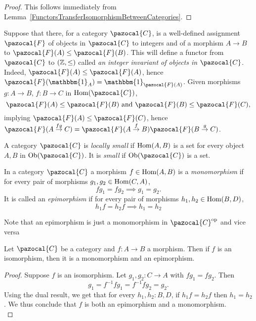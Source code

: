 \begin{proof}
    This follows immediately from Lemma~\ref{FunctorsTransferIsomorphismBetweenCategories}.
\end{proof}
\begin{example}\label{IntegerInvariants}
    Suppose that there, for a category $\pazocal{C}$, is a well-defined assignment $\pazocal{F}$ of objects in $\pazocal{C}$ to integers and of a morphism $A\rightarrow B$ to $\pazocal{F}(A)\leq \pazocal{F}(B)$. This will define a functor from $\pazocal{C}$ to $(\mathbb{Z},\leq)$ called \textit{an integer invariant of objects in $\pazocal{C}$}. Indeed, $\pazocal{F}(A) \leq \pazocal{F}(A)$, hence $\pazocal{F}(\mathbbm{1}_A)=\mathbbm{1}_{\pazocal{F}(A)}$. Given morphisms $g:A\rightarrow B$, $f:B\rightarrow C$ in $\Hom(\pazocal{C})$, 
    $$\pazocal{F}(A)\leq\pazocal{F}(B) \text{ and } \pazocal{F}(B)\leq \pazocal{F}(C),$$
    implying $\pazocal{F}(A)\leq \pazocal{F}(C)$, hence $\pazocal{F}(A\overset{fg}{\rightarrow} C) = \pazocal{F}(A\overset{f}{\rightarrow}B)\pazocal{F}(B\overset{g}{\rightarrow}C)$.
    
\end{example}
\begin{definition}
    A category $\pazocal{C}$ is \textit{locally small} if $\mathrm{Hom}(A,B)$ is a set for every object $A,B$ in $\Ob(\pazocal{C})$. It is \textit{small} if $\Ob(\pazocal{C})$ is a set.
\end{definition}
\begin{definition}
    In a category $\pazocal{C}$ a morphism $f\in \mathrm{Hom}(A,B)$ is a \textit{monomorphism} if for every pair of morphisms $g_1,g_2 \in \mathrm{Hom}(C,A)$, 
    $$fg_1=fg_2\implies g_1 = g_2.$$
    It is called an \textit{epimorphism} if for every pair of morphisms $h_1,h_2\in \mathrm{Hom}(B,D)$,
    $$h_1f=h_2f\implies h_1=h_2$$    
\end{definition}
\begin{remark}
    Note that an epimorphism is just a monomorphism in $\pazocal{C}\op$ and vice versa
\end{remark}\label{IsomorphismIsEpiAndMono}
\begin{lemma}
    Let $\pazocal{C}$ be a category and $f:A\rightarrow B$ a morphism. Then if $f$ is an isomorphism, then it is a monomorphism and an epimorphism.
\end{lemma}
\begin{proof}
    Suppose $f$ is an isomorphism. Let $g_1,g_2: C \rightarrow A$ with $fg_1=fg_2$. Then 
    $$
        g_1=f^{-1}fg_1 = f^{-1}fg_2 = g_2.
    $$
    Using the dual result, we get that for every $h_1,h_2: B,D$, if $h_1f=h_2f$ then $h_1=h_2$. We thus conclude that $f$ is both an epimorphism and a monomorphism.\\
\end{proof}
